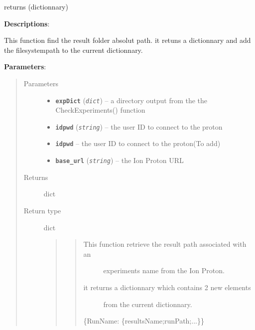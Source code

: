 \documentclass[letterpaper,10pt,english]{sphinxmanual}
\begin{document}
\begin{fulllineitems}
\label{datamanagerpkg:datamanagerpkg.ProtonCommunication_data_manager.FindResults}
returns (dictionnary)

\textbf{Descriptions}:

This function find the result folder absolut path. it retuns a dictionnary 
and add the filesystempath to the current dictionnary.

\textbf{Parameters}:
\begin{quote}\begin{description}
\item[{Parameters}] \leavevmode\begin{itemize}
\item {} 
\textbf{\texttt{expDict}} (\emph{\texttt{dict}}) -- a directory output from the the CheckExperiments() function

\item {} 
\textbf{\texttt{idpwd}} (\emph{\texttt{string}}) -- the user ID to connect to the proton

\item {} 
\textbf{\texttt{idpwd}} -- the user ID to connect to the proton(To add)

\item {} 
\textbf{\texttt{base\_url}} (\emph{\texttt{string}}) -- the Ion Proton URL

\end{itemize}

\item[{Returns}] \leavevmode
dict

\item[{Return type}] \leavevmode

dict
\begin{quote}
\begin{quote}
\begin{description}
\item[{This function retrieve the result path associated with an}] \leavevmode
experiments name from the Ion Proton.

\item[{it returns a dictionnary which contains 2 new elements}] \leavevmode
from the current dictionnary.

\end{description}

\{RunName: \{resultsName;runPath;...\}\}
\end{quote}


\end{quote}
\end{description}
\end{quote}
\end{fulllineitems}
\end{document}
